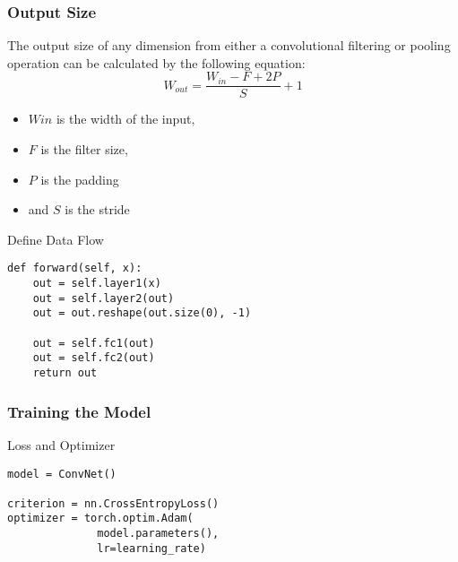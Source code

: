 \documentclass[14 pt]{beamer}
\let\olditem\item
\renewcommand{\item}{\olditem\vspace{4pt}}
\begin{document}
\begin{frame}
  \frametitle{Output Size}
  The output size of any dimension from either a convolutional filtering or
  pooling operation can be calculated by the following equation:
  \begin{displaymath}
    W_{out} = \frac{W_{in}-F+2P}{S} + 1
  \end{displaymath}
  \begin{itemize}
  \item   $W{in}$ is the width of the input, 
  \item $F$ is the filter size, 
  \item $P$ is the padding
\item and $S$ is the stride
\end{itemize}
\end{frame}

\begin{frame}[fragile]
  \begin{block}{Define Data Flow}
\begin{verbatim}
def forward(self, x):
    out = self.layer1(x)
    out = self.layer2(out)
    out = out.reshape(out.size(0), -1)

    out = self.fc1(out)
    out = self.fc2(out)
    return out
\end{verbatim}
  \end{block}
\end{frame}

\begin{frame}[fragile]
  \frametitle{Training the Model}
  \begin{block}{Loss and Optimizer}
\begin{verbatim}
model = ConvNet()

criterion = nn.CrossEntropyLoss()
optimizer = torch.optim.Adam(
              model.parameters(), 
              lr=learning_rate)
\end{verbatim}
  \end{block}
\end{frame}
\end{document}
